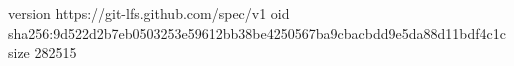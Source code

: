 version https://git-lfs.github.com/spec/v1
oid sha256:9d522d2b7eb0503253e59612bb38be4250567ba9cbacbdd9e5da88d11bdf4c1c
size 282515

